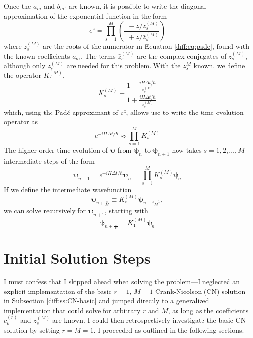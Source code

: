 \documentclass[11pt, a4paper]{article}
\begin{document}
Once the $ a_{m} $ and $ b_{m'} $ are known, it is possible to write the diagonal approximation of the exponential function in the form
\begin{equation*}
	e^{z} = \prod_{s=1}^{M}\left(\frac{1 - z/z_{s}^{(M)}}{1 + z/\bar{z}_{s}^{(M)}}\right)
\end{equation*}
where $ z_{s}^{(M)} $ are the roots of the numerator in Equation \ref{diff:eq:pade}, found with the known coefficients $ a_{m} $. The terms $ \bar{z}_{s}^{(M)} $ are the complex conjugates of $ z_{s}^{(M)} $, although only $ z_{s}^{(M)} $ are needed for this problem. With the $ z_{s}^{M} $ known, we define the operator $ K_{s}^{(M)} $,
\begin{equation*}
	K_{s}^{(M)} \equiv \frac{1 - \frac{iH\Delta t/\hbar}{z_{s}^{(M)}}}{1 + \frac{iH\Delta t/\hbar}{\bar{z}_{s}^{(M)}}}
\end{equation*}
which, using the Pad\'{e} approximant of $ e^{z} $, allows use to write the time evolution operator as
\begin{equation*}
	e^{-iH\Delta t / \hbar} \approx \prod_{s=1}^{M}K_{s}^{(M)}
\end{equation*}
The higher-order time evolution of $ \bm{\psi} $ from $ \bm{\psi}_{n} $ to $ \bm{\psi}_{n+1} $ now takes $ s = 1, 2, \ldots, M $ intermediate steps of the form
\begin{equation}
	\bm{\psi}_{n+1} = e^{-iH\Delta t / \hbar}\bm{\psi}_{n} = \prod_{s=1}^{M}K_{s}^{(M)} \bm{\psi}_{n} \label{diff:eq:psi-higher-M}
\end{equation}
If we define the intermediate wavefunction
\begin{equation*}
	\bm{\psi}_{n+\frac{s}{M}} \equiv K_{s}^{(M)}\bm{\psi}_{n+\frac{s-1}{M}},
\end{equation*}
we can solve recursively for $ \bm{\psi}_{n+1} $, starting with
\begin{equation*}
	\bm{\psi}_{n+\frac{1}{M}} = K_{1}^{(M)} \bm{\psi}_{n}
\end{equation*}



\section{Initial Solution Steps} \label{diff:s:solution}
I must confess that I skipped ahead when solving the problem---I neglected an explicit implementation of the basic $ r = 1 $,  $ M = 1 $ Crank-Nicolson (CN) solution in \hyperref[diff:ss:CN-basic]{Subsection \ref{diff:ss:CN-basic}} and jumped directly to a generalized implementation that could solve for arbitrary $ r $ and $ M $, as long as the coefficients $ c_{k}^{(r)} $ and $ z_{s}^{(M)} $ are known. I could then retrospectively investigate the basic CN solution by setting $ r = M = 1 $. I proceeded as outlined in the following sections.
\end{document}

